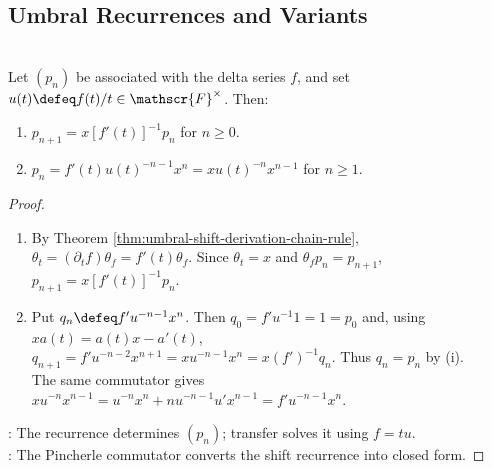 \subsection{Umbral Recurrences and Variants}

\begin{theorem} \label{thm:associated-sequence-recurrence-and-transfer} \\
Let $(p_n)$ be associated with the delta series $f$, and set $u(t)\defeq f(t)/t\in\mathscr{F}^{\times}$. Then:
\begin{enumerate}[label=(\roman*)]
\setlength{\itemsep}{0pt}
\item $p_{n+1}=x[f'(t)]^{-1}p_n$ for $n\geq0$.
\item $p_n=f'(t)u(t)^{-n-1}x^n=xu(t)^{-n}x^{n-1}$ for $n\geq1$.
\end{enumerate}
\begin{proof}
\begin{enumerate}[label=(\roman*)]
\setlength{\itemsep}{0pt}
\item By Theorem \ref{thm:umbral-shift-derivation-chain-rule}, $\theta_t=(\partial_t f)\theta_f=f'(t)\theta_f$. Since $\theta_t=x$ and $\theta_fp_n=p_{n+1}$, $p_{n+1}=x[f'(t)]^{-1}p_n$.
\item Put $q_n\defeq f'u^{-n-1}x^n$. Then $q_0=f'u^{-1}1=1=p_0$ and, using $xa(t)=a(t)x-a'(t)$,\\
$q_{n+1}=f'u^{-n-2}x^{n+1}=xu^{-n-1}x^n=x(f')^{-1}q_n$. Thus $q_n=p_n$ by (i).\\
The same commutator gives $xu^{-n}x^{n-1}=u^{-n}x^n+nu^{-n-1}u'x^{n-1}=f'u^{-n-1}x^n$.
\end{enumerate}
: The recurrence determines $(p_n)$; transfer solves it using $f=tu$.\\
: The Pincherle commutator converts the shift recurrence into closed form.
\end{proof}
\end{theorem}

